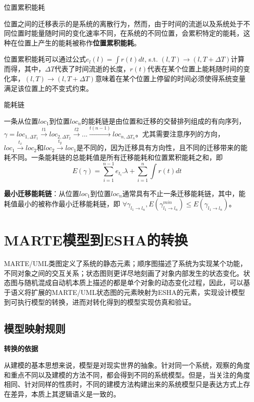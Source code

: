 \begin{myDef}位置累积能耗\end{myDef}
	位置之间的迁移表示的是系统的离散行为，然而，由于时间的流逝以及系统处于不同位置时能量随时间的变化速率不同，在系统的不同位置，会累积特定的能耗，这种在位置上产生的能耗被称作\textbf{位置累积能耗}。

	位置累积能耗可以通过公式$e_{l}(l) =\int r(t) dt$, s.t. $(l,T)\rightarrow(l,T + \Delta T)$计算而得，其中，$\Delta T$代表了时间流逝的长度，$r(t)$代表在某个位置上能耗随时间的变化率，$(l,T)\rightarrow(l,T + \Delta T)$意味着在某个位置上停留的时间必须使得系统变量满足该位置上的不变式约束。

\begin{myDef}能耗链\end{myDef}
	一条从位置$loc_{1}$到位置$loc_{n}$的能耗链是由位置和迁移的交替排列组成的有向序列，$\gamma = loc_{1,\Delta T_{1}} \xrightarrow{t1} loc_{2,\Delta T_{2}} \xrightarrow{t2} ... \xrightarrow{t(n-1)} loc_{n,\Delta T_{n}}$。尤其需要注意序列的方向，$loc_{1} \xrightarrow{t_{x}} loc_{2}$和$loc_{2} \xrightarrow{t_{y}} loc_{1}$是不同的，因为迁移具有方向性，且不同的迁移带来的能耗不同。一条能耗链的总能耗值是所有迁移能耗和位置累积能耗之和，即
	\begin{equation}
	E(\gamma) = \sum_{i=1}^{n-1}e_{t_{i}}.\lambda + \sum_{i=1}^{n} \int r(t) dt
	\end{equation}
	
	\textbf{最小迁移能耗链}：从位置$loc_{1}$到位置$loc_{n}$通常具有不止一条迁移能耗链，其中，能耗值最小的被称作最小迁移能耗链，即 $\forall \gamma_{l_{1} \rightarrow l_{n}}, E(\gamma_{l_{1} \rightarrow l_{n}}^{min})\leq E(\gamma_{l_{1} \rightarrow l_{n}})$。
		
\section{MARTE模型到ESHA的转换}
	MARTE/UML类图定义了系统的静态元素；顺序图描述了系统为实现某个功能，不同对象之间的交互关系；状态图则更详尽地刻画了对象内部发生的状态变化。状态图与随机混成自动机本质上描述的都是单个对象的动态变化过程，因此，可以基于语义将扩展的MARTE/UML状态图的元素映射为ESHA的元素，实现设计模型到可执行模型的转换，进而对转化得到的模型实现仿真和验证。

\subsection{模型映射规则}
	\textbf{转换的依据}
	
	从建模的基本思想来说，模型是对现实世界的抽象。针对同一个系统，观察的角度和重点不同以及建模的方法不同，都会得到不同的系统模型。但是，当关注的角度相同、针对同样的性质时，不同的建模方法构建出来的系统模型只是表达方式上存在差异，本质上其逻辑语义是一致的\citep{彭大天2013基于}。
	
